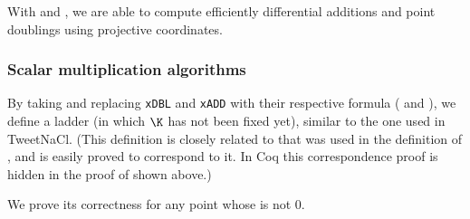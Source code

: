 With  and , we are able to compute efficiently
differential additions and point doublings using projective coordinates.

\subsubsection{Scalar multiplication algorithms}
\label{subsec:ECC-ladder}

By taking  and replacing \texttt{xDBL} and \texttt{xADD}
with their respective formula ( and ),
we define a ladder  (in which $\K$ has not been fixed yet),
similar to the one used in
TweetNaCl.
(This definition is closely related to  that was used
in the definition of , and is easily proved to correspond to it.
In Coq this correspondence proof is hidden in the proof of  shown above.)

We prove its correctness for any point whose \xcoord is not 0.


